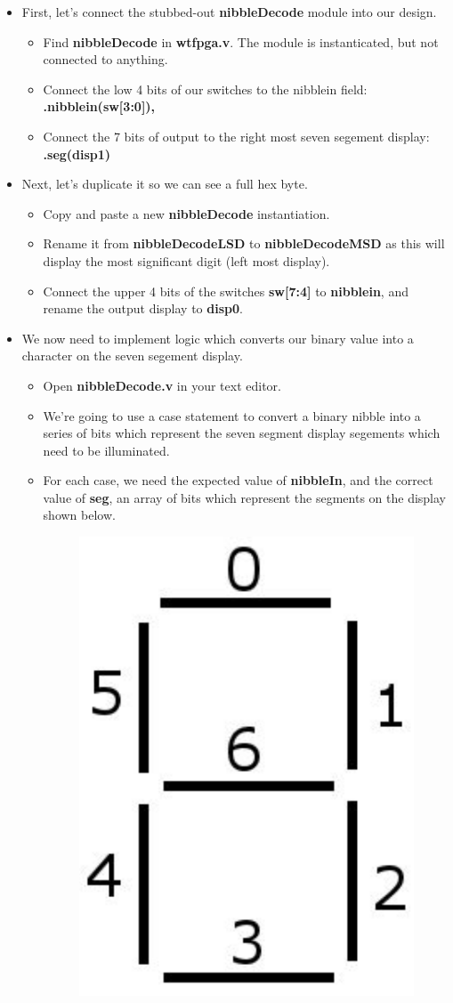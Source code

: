 \documentclass[12pt,a4paper]{article}
\begin{document}
\begin{itemize}
	\item First, let's connect the stubbed-out \textbf{nibbleDecode} module into our design. 
	\begin{itemize}
		\item Find \textbf{nibbleDecode} in \textbf{wtfpga.v}. The module is instanticated, but not connected to anything. 
		\item Connect the low 4 bits of our switches to the nibblein field: \textbf{.nibblein(sw[3:0]),}
		\item Connect the 7 bits of output to the right most seven segement display: \textbf{.seg(disp1)}
	\end{itemize}
	\item Next, let's duplicate it so we can see a full hex byte.
	\begin{itemize}
		\item Copy and paste a new \textbf{nibbleDecode} instantiation. 
		\item Rename it from \textbf{nibbleDecodeLSD} to \textbf{nibbleDecodeMSD} as this will display the most significant digit (left most display).
		\item Connect the upper 4 bits of the switches \textbf{sw[7:4]} to \textbf{nibblein}, and rename the output display to \textbf{disp0}.
	\end{itemize}
	\item We now need to implement logic which converts our binary value into a character on the seven segement display.
	\begin{itemize}
		\item Open \textbf{nibbleDecode.v} in your text editor. 
		\item We're going to use a case statement to convert a binary nibble into a series of bits which represent the seven segment display segements which need to be illuminated. 
		\item For each case, we need the expected value of \textbf{nibbleIn}, and the correct value of \textbf{seg}, an array of bits which represent the segments on the display shown below.
		\begin{figure}[H]
		\begin{center}
			\includegraphics[width=0.25\linewidth]{segments.png}

\end{center}
\end{figure}
\end{itemize}
\end{itemize}
\end{document}

